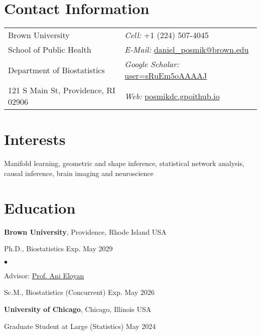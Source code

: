 \documentclass[margin,line]{res}
\newenvironment{list1}{
  \begin{list}{\ding{113}}{%
      \setlength{\itemsep}{0in}
      \setlength{\parsep}{0in} \setlength{\parskip}{0in}
      \setlength{\topsep}{0in} \setlength{\partopsep}{0in} 
      \setlength{\leftmargin}{0.17in}}}{\end{list}}
\newenvironment{list2}{
  \begin{list}{$\bullet$}{%
      \setlength{\itemsep}{0in}
      \setlength{\parsep}{0in} \setlength{\parskip}{0in}
      \setlength{\topsep}{0in} \setlength{\partopsep}{0in} 
      \setlength{\leftmargin}{0.2in}}}{\end{list}}
\begin{document}

\begin{resume}
\section{\sc Contact Information}
\vspace{.05in}
\begin{tabular}{@{}p{3in}p{4in}}
Brown University & {\it Cell:} +1 (224) 507-4045 \\ 
School of Public Health & {\it E-Mail:} \href{mailto:daniel_posmik@brown.edu}{daniel\_posmik@brown.edu} \\ 
Department of Biostatistics & {\it Google Scholar:} \href{https://scholar.google.com/citations?user=sRuEm5oAAAAJ}{user=sRuEm5oAAAAJ} \\
121 S Main St, Providence, RI 02906 & {\it Web:} \href{https://posmikdc.github.io}{posmikdc.gpoithub.io} \\       
\end{tabular}

\section{\sc Interests}
Manifold learning, geometric and shape inference, statistical network analysis, causal inference, brain imaging and neuroscience

\section{\sc Education}
{\bf Brown University}, Providence, Rhode Island USA\\
\vspace*{-.15in}
\begin{list1}
  \item[] Ph.D., Biostatistics \hfill Exp. May 2029

\begin{list2}
\vspace*{.05in}
\item Advisor: \href{}{Prof. Ani Eloyan}
\end{list2}
\vspace*{.03in}
\item[] Sc.M., Biostatistics (Concurrent) \hfill Exp. May 2026
\end{list1}

{\bf University of Chicago}, Chicago, Illinois USA\\
\vspace*{-.15in}
\begin{list1}
\item[] Graduate Student at Large (Statistics) \hfill May 2024
\end{list1}


\end{resume}
\end{document}

